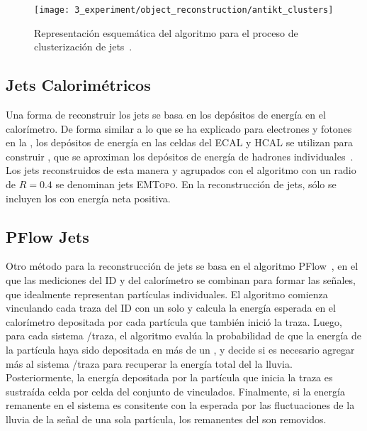 \begin{figure}[ht!]
    \centering
    \texttt{[image: 3\_experiment/object\_reconstruction/antikt\_clusters]}
    \caption{Representaci\'on esquem\'atica del algoritmo \antikt para el proceso de clusterizaci\'on de jets~\cite{AntiKtAlgorithm}.}
    \label{fig:objects:jets:antikt}
\end{figure}

\subsection{Jets Calorim\'etricos}

Una forma de reconstruir los jets se basa en los depósitos de energía en el calorímetro. De forma similar a lo que se ha explicado para electrones y fotones en la \Sect{\ref{subsec:objects:egamma:reco}}, los depósitos de energía en las celdas del \ac{ECAL} y \ac{HCAL} se utilizan para construir \topos, que se aproximan los depósitos de energía de hadrones individuales~\cite{ATLAS-TopoClusters-Run1,ATLAS-TopoClusters-Run2}. Los jets reconstruidos de esta manera y agrupados con el algoritmo \antikt con un radio de \(R=0.4\) se denominan jets \textsc{EMTopo}. En la reconstrucción de jets, sólo se incluyen los \topos con energía neta positiva.

\subsection{\acf{PFlow} Jets}

Otro m\'etodo para la reconstrucci\'on de jets se basa en el algoritmo \ac{PFlow}~\cite{ATLAS-JetPFlow-Performance}, en el que las mediciones del \ac{ID} y del calorímetro se combinan para formar las señales, que idealmente representan partículas individuales. El algoritmo comienza vinculando cada traza del \ac{ID} con un solo \topo y calcula la energ\'ia esperada en el calor\'imetro depositada por cada part\'icula que tambi\'en inici\'o la traza. Luego, para cada sistema \topo/traza, el algoritmo eval\'ua la probabilidad de que la energ\'ia de la part\'icula haya sido depositada en m\'as de un \topo, y decide si es necesario agregar m\'as \topos al sistema \topo/traza para recuperar la energ\'ia total del la lluvia. Posteriormente, la energ\'ia depositada por la part\'icula que inicia la traza es sustra\'ida celda por celda del conjunto de \topos vinculados. Finalmente, si la energ\'ia remanente en el sistema es consitente con la esperada por las fluctuaciones de la lluvia de la se\~nal de una sola part\'icula, los remanentes del \topo son removidos.


